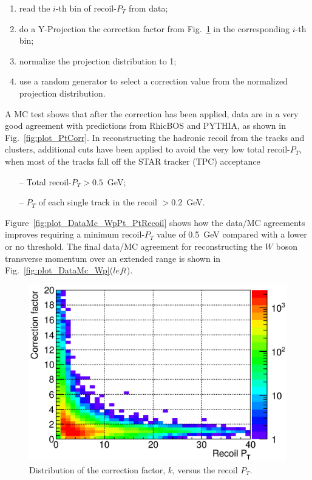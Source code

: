 \documentclass[12pt]{article}
\begin{document}
\begin{enumerate}
   \item read the $i$-th bin of recoil-$P_{T}$ from data;
   \item do a Y-Projection the correction factor from Fig.~\ref{fig:plot_PtCorrFactor} in the corresponding $i$-th bin;
   \item normalize the projection distribution to 1;
   \item use a random generator to select a correction value from the normalized projection distribution.
\end{enumerate}

A MC test shows that after the correction has been applied, data are in a very good agreement with predictions from RhicBOS and PYTHIA, as shown in Fig.~\ref{fig:plot_PtCorr}. In reconstructing the hadronic recoil from the tracks and clusters, additional cuts have been applied to avoid the very low total recoil-$P_{T}$, when most of the tracks fall off the STAR tracker (TPC) acceptance 
\begin{itemize}
   \item[--] Total recoil-$P_{T} > 0.5$~GeV; 
    \item[--] $P_{T}$ of each single track in the recoil $> 0.2$~GeV. 
\end{itemize}
Figure~\ref{fig:plot_DataMc_WpPt_PtRecoil} shows how the data/MC agreements improves requiring a minimum recoil-$P_{T}$ value of 0.5~GeV compared with a lower or no threshold.
The final data/MC agreement for reconstructing the $W$ boson transverse momentum over an extended range is  shown in Fig.~\ref{fig:plot_DataMc_Wp}($left$).


\begin{figure}[htbp]
\begin{center}
\includegraphics[scale=0.8]{images/plot_PtCorrFactor}
\end{center}
\caption{Distribution of the correction factor, $k$, versus the recoil $P_{T}$.}
\label{fig:plot_PtCorrFactor} 
\end{figure}
\end{document}
